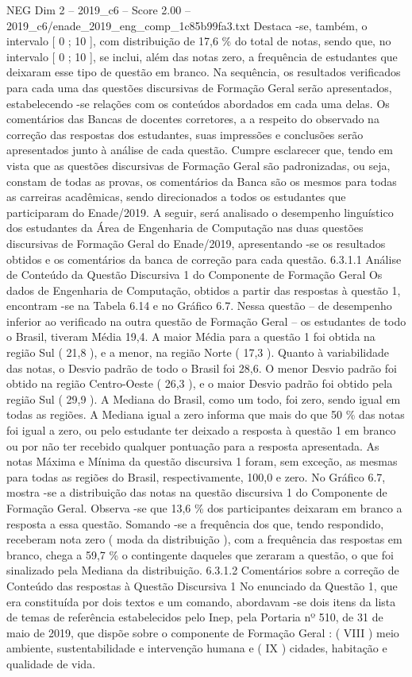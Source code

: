 \begin{textsample}{NEG Dim 2 – 2019\_c6 – Score 2.00 – 2019\_c6/enade\_2019\_eng\_comp\_1c85b99fa3.txt}
Destaca -se, também, o intervalo [ 0 ; 10 ], com distribuição de 17,6 \% do total de notas, sendo que, no intervalo [ 0 ; 10 ], se inclui, além das notas zero, a frequência de estudantes que deixaram esse tipo de questão em branco.
Na sequência, os resultados verificados para cada uma das questões discursivas de Formação Geral serão apresentados, estabelecendo -se relações com os conteúdos abordados em cada uma delas.
Os comentários das Bancas de docentes corretores, a a respeito do observado na correção das respostas dos estudantes, suas impressões e conclusões serão apresentados junto à análise de cada questão.
Cumpre esclarecer que, tendo em vista que as questões discursivas de Formação Geral são padronizadas, ou seja, constam de todas as provas, os comentários da Banca são os mesmos para todas as carreiras acadêmicas, sendo direcionados a todos os estudantes que participaram do Enade/2019.
A seguir, será analisado o desempenho linguístico dos estudantes da Área de Engenharia de Computação nas duas questões discursivas de Formação Geral do Enade/2019, apresentando -se os resultados obtidos e os comentários da banca de correção para cada questão. 6.3.1.1 Análise de Conteúdo da Questão Discursiva 1 do Componente de Formação Geral Os dados de Engenharia de Computação, obtidos a partir das respostas à questão 1, encontram -se na Tabela 6.14 e no Gráfico 6.7.
Nessa questão – de desempenho inferior ao verificado na outra questão de Formação Geral – os estudantes de todo o Brasil, tiveram Média 19,4.
A maior Média para a questão 1 foi obtida na região Sul ( 21,8 ), e a menor, na região Norte ( 17,3 ).
Quanto à variabilidade das notas, o Desvio padrão de todo o Brasil foi 28,6.
O menor Desvio padrão foi obtido na região Centro-Oeste ( 26,3 ), e o maior Desvio padrão foi obtido pela região Sul ( 29,9 ).
A Mediana do Brasil, como um todo, foi zero, sendo igual em todas as regiões.
A Mediana igual a zero informa que mais do que 50 \% das notas foi igual a zero, ou pelo estudante ter deixado a resposta à questão 1 em branco ou por não ter recebido qualquer pontuação para a resposta apresentada.
As notas Máxima e Mínima da questão discursiva 1 foram, sem exceção, as mesmas para todas as regiões do Brasil, respectivamente, 100,0 e zero.
No Gráfico 6.7, mostra -se a distribuição das notas na questão discursiva 1 do Componente de Formação Geral.
Observa -se que 13,6 \% dos participantes deixaram em branco a resposta a essa questão.
Somando -se a frequência dos que, tendo respondido, receberam nota zero ( moda da distribuição ), com a frequência das respostas em branco, chega a 59,7 \% o contingente daqueles que zeraram a questão, o que foi sinalizado pela Mediana da distribuição. 6.3.1.2 Comentários sobre a correção de Conteúdo das respostas à Questão Discursiva 1 No enunciado da Questão 1, que era constituída por dois textos e um comando, abordavam -se dois itens da lista de temas de referência estabelecidos pelo Inep, pela Portaria nº 510, de 31 de maio de 2019, que dispõe sobre o componente de Formação Geral : ( VIII ) meio ambiente, sustentabilidade e intervenção humana e ( IX ) cidades, habitação e qualidade de vida.

\end{textsample}
